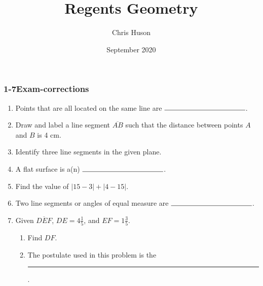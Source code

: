 \documentclass[12pt, twoside]{article}
\title{Regents Geometry}
\author{Chris Huson}
\date{September 2020}
\begin{document}
\subsubsection*{1-7Exam-corrections}
\begin{enumerate}
\item Points that are all located on the same line are $\rule{4cm}{0.15mm}$.\bigskip

\item Draw and label a line segment $\overline{AB}$ such that the distance between points $A$ and $B$ is 4 cm. \vspace{2cm}

\item Identify three line segments in the given plane.\\[0.25in]
     \vspace{1cm}

\item A flat surface is a(n) $\rule{4cm}{0.15mm}$. \bigskip

\item Find the value of $|15-3|+|4-15|$. \bigskip

\item Two line segments or angles of equal measure are $\rule{4cm}{0.15mm}$.
    \bigskip

\item Given $\overline{DEF}$, $DE=4 \frac{1}{5}$, and $EF=1 \frac{3}{5}$.
  \begin{enumerate}
    \item Find ${DF}$.\\[.5in]
       \bigskip
    \item The postulate used in this problem is the \rule{6cm}{0.15mm}.
  \end{enumerate}


\end{enumerate}
\end{document}
